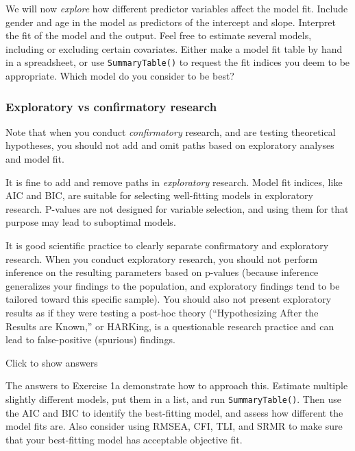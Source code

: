 \documentclass[
]{book}
\begin{document}
We will now \emph{explore} how different predictor variables affect the model fit.
Include gender and age in the model as predictors of the intercept and slope. Interpret the fit of the model
and the output.
Feel free to estimate several models, including or excluding certain covariates.
Either make a model fit table by hand in a spreadsheet, or use \texttt{SummaryTable()} to request the fit indices you deem to be appropriate.
Which model do you consider to be best?

\hypertarget{exploratory-vs-confirmatory-research}{%
\subsubsection{Exploratory vs confirmatory research}\label{exploratory-vs-confirmatory-research}}

Note that when you conduct \emph{confirmatory} research, and are testing theoretical hypotheses, you should not add and omit paths based on exploratory analyses and model fit.

It is fine to add and remove paths in \emph{exploratory} research. Model fit indices, like AIC and BIC, are suitable for selecting well-fitting models in exploratory research. P-values are not designed for variable selection, and using them for that purpose may lead to suboptimal models.

It is good scientific practice to clearly separate confirmatory and exploratory research. When you conduct exploratory research, you should not perform inference on the resulting parameters based on p-values (because inference generalizes your findings to the population, and exploratory findings tend to be tailored toward this specific sample).
You should also not present exploratory results as if they were testing a post-hoc theory (``Hypothesizing After the Results are Known,'' or HARKing, is a questionable research practice and can lead to false-positive (spurious) findings.

Click to show answers

The answers to Exercise 1a demonstrate how to approach this.
Estimate multiple slightly different models, put them in a list, and run \texttt{SummaryTable()}.
Then use the AIC and BIC to identify the best-fitting model,
and assess how different the model fits are.
Also consider using RMSEA, CFI, TLI, and SRMR to make sure that your best-fitting
model has acceptable objective fit.
\end{document}
